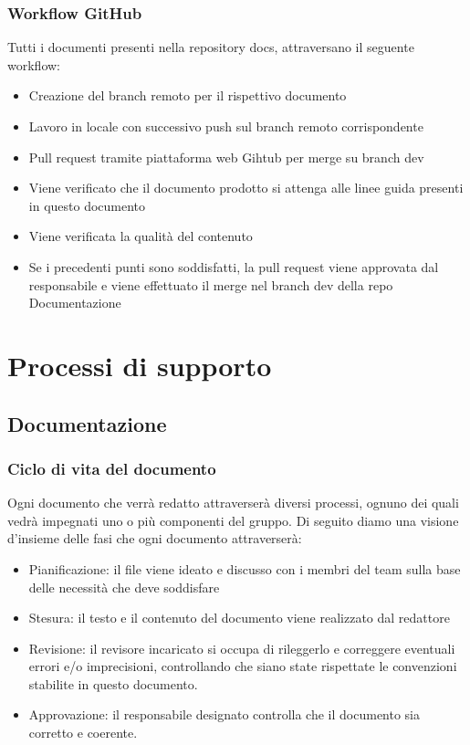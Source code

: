 \documentclass[12pt]{article}
\begin{document}
\subsubsection{Workflow GitHub}
Tutti i documenti presenti nella repository docs, attraversano il seguente workflow:

\begin{itemize}
    \item Creazione del branch remoto per il rispettivo documento
    \item Lavoro in locale con successivo push sul branch remoto corrispondente
    \item Pull request tramite piattaforma web Gihtub per merge su branch dev
    \item Viene verificato che il documento prodotto si attenga alle linee guida presenti in questo documento
    \item Viene verificata la qualità del contenuto
    \item Se i precedenti punti sono soddisfatti, la pull request viene approvata dal responsabile e viene effettuato il merge nel branch dev della repo Documentazione
\end{itemize}

\section{Processi di supporto}

\subsection{Documentazione}
\subsubsection{Ciclo di vita del documento}
Ogni documento che verrà redatto attraverserà diversi processi, ognuno dei quali vedrà impegnati uno o più componenti del gruppo.
Di seguito diamo una visione d'insieme delle fasi che ogni documento attraverserà:
\begin{itemize}
    \item Pianificazione: il file viene ideato e discusso con i membri del team sulla base delle necessità che deve soddisfare
    \item Stesura: il testo e il contenuto del documento viene realizzato dal redattore
    \item Revisione: il revisore incaricato si occupa di rileggerlo e correggere eventuali errori e/o imprecisioni, controllando che siano state rispettate le convenzioni stabilite in questo documento.
    \item Approvazione: il responsabile designato controlla che il documento sia corretto e coerente.
\end{itemize}
\end{document}
